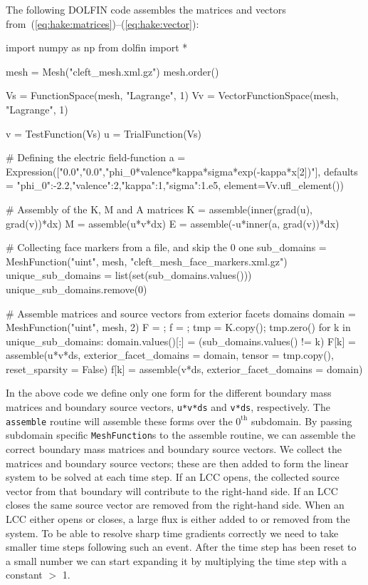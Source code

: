 The following DOLFIN code assembles the matrices and vectors
from~(\ref{eq:hake:matrices})--(\ref{eq:hake:vector}):
\begin{python}
import numpy as np
from dolfin import *

mesh = Mesh("cleft_mesh.xml.gz")
mesh.order()

Vs = FunctionSpace(mesh, "Lagrange", 1)
Vv = VectorFunctionSpace(mesh, "Lagrange", 1)

v = TestFunction(Vs)
u = TrialFunction(Vs)

# Defining the electric field-function
a = Expression(["0.0","0.0","phi_0*valence*kappa*sigma*exp(-kappa*x[2])"],
               defaults = {"phi_0":-2.2,"valence":2,"kappa":1,"sigma":1.e5},
               element=Vv.ufl_element())

# Assembly of the K, M and A matrices
K = assemble(inner(grad(u), grad(v))*dx)
M = assemble(u*v*dx)
E = assemble(-u*inner(a, grad(v))*dx)

# Collecting face markers from a file, and skip the 0 one
sub_domains = MeshFunction("uint", mesh, "cleft_mesh_face_markers.xml.gz")
unique_sub_domains = list(set(sub_domains.values()))
unique_sub_domains.remove(0)

# Assemble matrices and source vectors from exterior facets domains
domain = MeshFunction("uint", mesh, 2)
F = {}; f = {}; tmp = K.copy(); tmp.zero()
for k in unique_sub_domains:
    domain.values()[:] = (sub_domains.values() != k)
    F[k] = assemble(u*v*ds, exterior_facet_domains = domain,
                    tensor = tmp.copy(), reset_sparsity = False)
    f[k] = assemble(v*ds, exterior_facet_domains = domain)
\end{python}
In the above code we define only one form for the different boundary
mass matrices and boundary source vectors, \texttt{u*v*ds} and
\texttt{v*ds}, respectively. The \texttt{assemble} routine will
assemble these forms over the $0^{\scriptscriptstyle\text{th}}$
subdomain. By passing subdomain specific \texttt{MeshFunction}s to
the assemble routine, we can assemble the correct boundary mass
matrices and boundary source vectors. We collect the matrices and
boundary source vectors; these are then added to form the linear
system to be solved at each time step. If an LCC opens, the collected
source vector from that boundary will contribute to the right-hand
side. If an LCC closes the same source vector are removed from the
right-hand side. When an LCC either opens or closes, a large flux is
either added to or removed from the system. To be able to resolve
sharp time gradients correctly we need to take smaller time steps
following such an event. After the time step has been reset to a small
number we can start expanding it by multiplying the time step with a
constant $>$ 1.

